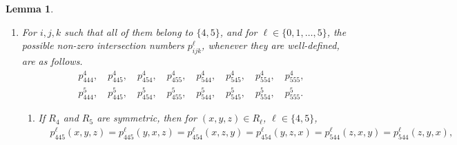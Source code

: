 \documentclass[11pt,oneside]{amsart}
\newtheorem{lemma}[theorem]{Lemma}
\begin{document}
{\begin{lemma}
\begin{enumerate}
        \begin{align*}
        &p_{144}^1,\quad p_{145}^1,\quad p_{154}^1,\quad p_{155}^1,\\
        &p_{424}^2,\quad p_{425}^2,\quad p_{524}^2,\quad p_{525}^2,\\
        &p_{443}^3,\quad p_{453}^3,\quad p_{543}^3,\quad p_{553}^3.
        \end{align*}
        If $R_4$ and $R_5$ are symmetric, then 
        \begin{align*}
        p_{1ii}^1(x,y,z)&=n_i^{(1)}(y,z)\quad \text{ for }i\in\{4,5\},\\
        p_{i2i}^2(x,y,z)&=n_i^{(2)}(x,z)\quad \text{ for }i\in\{4,5\},\\
        p_{ii3}^3(x,y,z)&=n_i^{(3)}(x,y)\quad \text{ for }i\in\{4,5\}, \\
        p_{145}^1&=p_{154}^1=p_{425}^2=p_{524}^2=p_{453}^3=p_{543}^3=0. 
        \end{align*}
        If $R_4$ and $R_5$ are skew-symmetric, then 
        \begin{align*}
        p_{1i \dot i}^1(x,y,z)&=n_i^{(1)}(y,z)\quad \text{ for }i\in\{4,5\},\\
        p_{i2\dot i}^2(x,y,z)&=n_i^{(2)}(x,z)\quad \text{ for }i\in\{4,5\},\\
        p_{i\dot i 3}^3(x,y,z)&=n_i^{(3)}(x,y)\quad \text{ for }i\in\{4,5\}, \\
        p_{144}^1&=p_{155}^1=p_{424}^2=p_{525}^2=p_{443}^3=p_{553}^3=0.
        \end{align*}
        \item For $i,j,k$ such that all of them belong to $\{4,5\}$, and for $\ell\in\{0,1,\ldots,5\}$, the possible non-zero intersection numbers $p_{ijk}^\ell$, whenever they are well-defined, are as follows.
        \begin{align*}
        &p_{444}^4,\quad p_{445}^4,\quad p_{454}^4,\quad p_{455}^4,\quad p_{544}^4,\quad p_{545}^4,\quad p_{554}^4,\quad p_{555}^4,\\
        &p_{444}^5,\quad p_{445}^5,\quad p_{454}^5,\quad p_{455}^5,\quad p_{544}^5,\quad p_{545}^5,\quad p_{554}^5,\quad p_{555}^5.         
        \end{align*}
        \begin{enumerate}
            \item 
        If $R_4$ and $R_5$ are symmetric, then for $(x,y,z)\in R_\ell$, $\ell\in\{4,5\}$, 
        \begin{align*}
        &p_{445}^\ell(x,y,z)=p_{445}^\ell(y,x,z)=p_{454}^\ell(x,z,y)=p_{454}^\ell(y,z,x)=p_{544}^\ell(z,x,y)=p_{544}^\ell(z,y,x),\\

\end{align*}
\end{enumerate}
\end{enumerate}
\end{lemma}}
\end{document}
